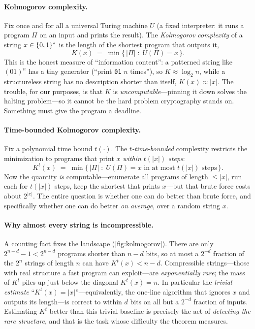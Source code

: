 \paragraph{Kolmogorov complexity.} Fix once and for all a universal
Turing machine $U$ (a fixed interpreter: it runs a program $\Pi$ on an
input and prints the result). The \emph{Kolmogorov complexity} of a
string $x \in \{0,1\}^{*}$ is the length of the shortest program
that outputs it,
\[
  K(x) \;=\; \min\bigl\{\, |\Pi| \;:\; U(\Pi) = x \,\bigr\}.
\]
This is the honest measure of ``information content'': a patterned
string like $(01)^{n}$ has a tiny generator (``print \texttt{01}
$n$ times''), so $K \approx \log_2 n$, while a structureless string has
no description shorter than itself, $K(x) \approx |x|$. The trouble, for
our purposes, is that $K$ is \emph{uncomputable}---pinning it down
solves the halting problem---so it cannot be the hard problem
cryptography stands on. Something must give the program a deadline.

\paragraph{Time-bounded Kolmogorov complexity.} Fix a polynomial time
bound $t(\cdot)$. The \emph{$t$-time-bounded} complexity restricts the
minimization to programs that print $x$ \emph{within $t(|x|)$ steps}:
\[
  K^{t}(x) \;=\; \min\bigl\{\, |\Pi| \;:\;
      U(\Pi) = x \text{ in at most } t(|x|) \text{ steps} \,\bigr\}.
\]
Now the quantity \emph{is} computable---enumerate all programs of length
$\le |x|$, run each for $t(|x|)$ steps, keep the shortest that prints
$x$---but that brute force costs about $2^{|x|}$. The entire question is
whether one can do better than brute force, and specifically whether one
can do better \emph{on average}, over a random string $x$.

\paragraph{Why almost every string is incompressible.} A counting fact
fixes the landscape (\cref{fig:kolmogorov}). There are only
$2^{n-d}-1 < 2^{n-d}$ programs shorter than $n-d$ bits, so at most a
$2^{-d}$ fraction of the $2^{n}$ strings of length $n$ can have
$K^{t}(x) < n-d$. Compressible strings---those with real structure a
fast program can exploit---are \emph{exponentially rare}; the mass of
$K^{t}$ piles up just below the diagonal $K^{t}(x)=n$. In particular the
\emph{trivial estimate} ``$K^{t}(x) = |x|$''---equivalently, the
one-line algorithm that ignores $x$ and outputs its length---is correct
to within $d$ bits on all but a $2^{-d}$ fraction of inputs. Estimating
$K^{t}$ better than this trivial baseline is precisely the act of
\emph{detecting the rare structure}, and that is the task whose
difficulty the theorem measures.

